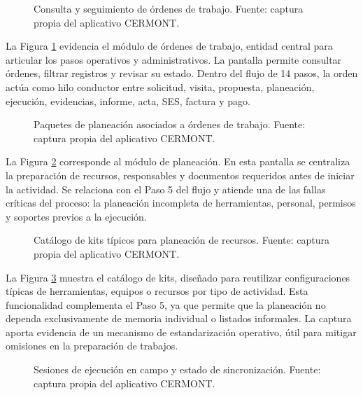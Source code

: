 \begin{figure}[H]
\centering
{}
\caption{Consulta y seguimiento de órdenes de trabajo. Fuente: captura propia del aplicativo CERMONT.}
\label{fig:captura-ordenes-trabajo}
\end{figure}

La Figura \ref{fig:captura-ordenes-trabajo} evidencia el módulo de órdenes de trabajo, entidad central para articular los pasos operativos y administrativos. La pantalla permite consultar órdenes, filtrar registros y revisar su estado. Dentro del flujo de 14 pasos, la orden actúa como hilo conductor entre solicitud, visita, propuesta, planeación, ejecución, evidencias, informe, acta, SES, factura y pago.

\begin{figure}[H]
\centering
{}
\caption{Paquetes de planeación asociados a órdenes de trabajo. Fuente: captura propia del aplicativo CERMONT.}
\label{fig:captura-planeacion}
\end{figure}

La Figura \ref{fig:captura-planeacion} corresponde al módulo de planeación. En esta pantalla se centraliza la preparación de recursos, responsables y documentos requeridos antes de iniciar la actividad. Se relaciona con el Paso 5 del flujo y atiende una de las fallas críticas del proceso: la planeación incompleta de herramientas, personal, permisos y soportes previos a la ejecución.

\begin{figure}[H]
\centering
{}
\caption{Catálogo de kits típicos para planeación de recursos. Fuente: captura propia del aplicativo CERMONT.}
\label{fig:captura-catalogo-kits}
\end{figure}

La Figura \ref{fig:captura-catalogo-kits} muestra el catálogo de kits, diseñado para reutilizar configuraciones típicas de herramientas, equipos o recursos por tipo de actividad. Esta funcionalidad complementa el Paso 5, ya que permite que la planeación no dependa exclusivamente de memoria individual o listados informales. La captura aporta evidencia de un mecanismo de estandarización operativo, útil para mitigar omisiones en la preparación de trabajos.

\begin{figure}[H]
\centering
{}
\caption{Sesiones de ejecución en campo y estado de sincronización. Fuente: captura propia del aplicativo CERMONT.}
\label{fig:captura-ejecucion}
\end{figure}

